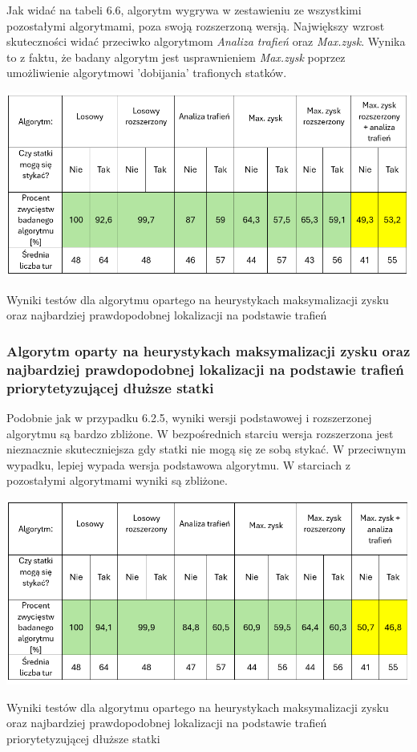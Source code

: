 Jak widać na tabeli 6.6, algorytm wygrywa w zestawieniu ze wszystkimi pozostałymi algorytmami, poza swoją rozszerzoną wersją. Największy wzrost skuteczności widać przeciwko algorytmom \emph{Analiza trafień} oraz \emph{Max.zysk}. Wynika to z faktu, że badany algorytm jest usprawnieniem \emph{Max.zysk} poprzez umożliwienie algorytmowi 'dobijania' trafionych statków.

\begin{table}[!h]
    \centering
    \includegraphics[width=1\linewidth]{img/table-location-hit-heuristic.png}
    \caption{Wyniki testów dla algorytmu opartego na heurystykach maksymalizacji zysku oraz najbardziej prawdopodobnej lokalizacji na podstawie trafień}
\end{table}

\subsubsection{Algorytm oparty na heurystykach maksymalizacji zysku oraz najbardziej prawdopodobnej lokalizacji na podstawie trafień priorytetyzującej dłuższe statki}

Podobnie jak w przypadku 6.2.5, wyniki wersji podstawowej i rozszerzonej algorytmu są bardzo zbliżone. W bezpośrednich starciu wersja rozszerzona jest nieznacznie skuteczniejsza gdy statki nie mogą się ze sobą stykać. W przeciwnym wypadku, lepiej wypada wersja podstawowa algorytmu. W starciach z pozostałymi algorytmami wyniki są zbliżone.

\begin{table}[!h]
    \centering
    \includegraphics[width=1\linewidth]{img/table-location-extended-hit-heuristic.png}
    \caption{Wyniki testów dla algorytmu opartego na heurystykach maksymalizacji zysku oraz najbardziej prawdopodobnej lokalizacji na podstawie trafień priorytetyzującej dłuższe statki}
\end{table}

